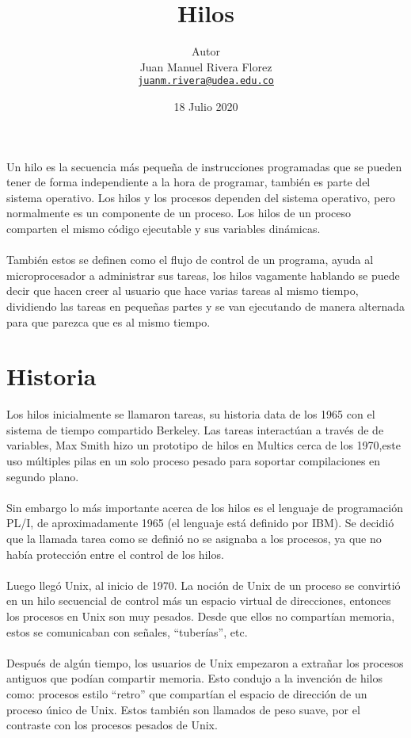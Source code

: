 \documentclass[11pt]{article}
\title{Hilos}
\author{{\Large Autor}\\Juan Manuel Rivera Florez\\
        \href{mailto:juanm.rivera@udea.edu.co}{\texttt{juanm.rivera@udea.edu.co}}}
\date{18 Julio 2020}
\begin{document}
\maketitle


%
Un hilo es la secuencia más pequeña de instrucciones programadas que se pueden tener de forma independiente a la hora de programar, también es parte del sistema operativo. Los hilos y los procesos dependen del sistema operativo, pero normalmente es un componente de un proceso. Los hilos de un proceso comparten el mismo código ejecutable y sus variables dinámicas.
%
\\
\\
%
También estos se definen como el flujo de control de un programa, ayuda al microprocesador a administrar sus tareas, los hilos vagamente hablando se puede decir que hacen creer al usuario que hace varias tareas al mismo tiempo, dividiendo las tareas en pequeñas partes y se van ejecutando de manera alternada para que parezca que es al mismo tiempo.
%
\section*{Historia}
%
Los hilos inicialmente se llamaron tareas, su historia data de los 1965 con el sistema de tiempo compartido Berkeley. Las tareas interactúan a través de de variables, Max Smith hizo un prototipo de hilos en Multics cerca de los 1970,este uso múltiples pilas en un solo proceso pesado para soportar compilaciones en segundo plano.
%
\\\\
Sin embargo lo más importante acerca de los hilos es el lenguaje de programación PL/I, de aproximadamente 1965 (el lenguaje está definido por IBM). Se decidió que la llamada tarea como se definió no se asignaba a los procesos, ya que no había protección entre el control de los hilos.
%
\\\\
%
Luego llegó Unix, al inicio de 1970. La noción de Unix de un proceso se convirtió en un hilo secuencial de control más un espacio virtual de direcciones, entonces los procesos en Unix son muy pesados. Desde que ellos no compartían memoria, estos se comunicaban con señales, “tuberías”, etc.
%
\\\\
%
Después de algún tiempo, los usuarios de Unix empezaron a extrañar los procesos antiguos que podían compartir memoria. Esto condujo a la invención de hilos como: procesos estilo “retro” que compartían el espacio de dirección de un proceso único de Unix. Estos también son llamados de peso suave, por el contraste con los procesos pesados de Unix.
%
\end{document}
